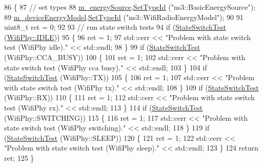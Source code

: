 \begin{DoxyCode}
86 \{
87   \textcolor{comment}{// set types}
88   \hyperlink{classBasicEnergyUpdateTest_a6e597bf5827d66a852d1bac88278d648}{m\_energySource}.\hyperlink{classns3_1_1ObjectFactory_a77dcd099064038a1eb7a6b8251229ec3}{SetTypeId} (\textcolor{stringliteral}{"ns3::BasicEnergySource"});
89   \hyperlink{classBasicEnergyUpdateTest_a8ae0adecca7e9f7d1db89ccb33dd5ae4}{m\_deviceEnergyModel}.\hyperlink{classns3_1_1ObjectFactory_a77dcd099064038a1eb7a6b8251229ec3}{SetTypeId} (\textcolor{stringliteral}{"ns3::WifiRadioEnergyModel"});
90 
91   uint8\_t ret = 0;
92 
93   \textcolor{comment}{// run state switch tests}
94   \textcolor{keywordflow}{if} (\hyperlink{classBasicEnergyUpdateTest_aebdf7df054db21ed34826ccdf208f6a6}{StateSwitchTest} (\hyperlink{namespacens3_aff37503a9e9f2dbe82b374050a73e105acb448301f46bfb634e8e803a6fd21264}{WifiPhy::IDLE}))
95     \{
96       ret = 1;
97       std::cerr << \textcolor{stringliteral}{"Problem with state switch test (WifiPhy idle)."} << std::endl;
98     \}
99   \textcolor{keywordflow}{if} (\hyperlink{classBasicEnergyUpdateTest_aebdf7df054db21ed34826ccdf208f6a6}{StateSwitchTest} (WifiPhy::CCA\_BUSY))
100     \{
101       ret = 1;
102       std::cerr << \textcolor{stringliteral}{"Problem with state switch test (WifiPhy cca busy)."} << std::endl;
103     \}
104   \textcolor{keywordflow}{if} (\hyperlink{classBasicEnergyUpdateTest_aebdf7df054db21ed34826ccdf208f6a6}{StateSwitchTest} (WifiPhy::TX))
105     \{
106       ret = 1;
107       std::cerr << \textcolor{stringliteral}{"Problem with state switch test (WifiPhy tx)."} << std::endl;
108     \}
109   \textcolor{keywordflow}{if} (\hyperlink{classBasicEnergyUpdateTest_aebdf7df054db21ed34826ccdf208f6a6}{StateSwitchTest} (WifiPhy::RX))
110     \{
111       ret = 1;
112       std::cerr << \textcolor{stringliteral}{"Problem with state switch test (WifiPhy rx)."} << std::endl;
113     \}
114   \textcolor{keywordflow}{if} (\hyperlink{classBasicEnergyUpdateTest_aebdf7df054db21ed34826ccdf208f6a6}{StateSwitchTest} (WifiPhy::SWITCHING))
115     \{
116       ret = 1;
117       std::cerr << \textcolor{stringliteral}{"Problem with state switch test (WifiPhy switching)."} << std::endl;
118     \}
119   \textcolor{keywordflow}{if} (\hyperlink{classBasicEnergyUpdateTest_aebdf7df054db21ed34826ccdf208f6a6}{StateSwitchTest} (WifiPhy::SLEEP))
120     \{
121       ret = 1;
122       std::cerr << \textcolor{stringliteral}{"Problem with state switch test (WifiPhy sleep)."} << std::endl;
123     \}
124   \textcolor{keywordflow}{return} ret;
125 \}
\end{DoxyCode}


